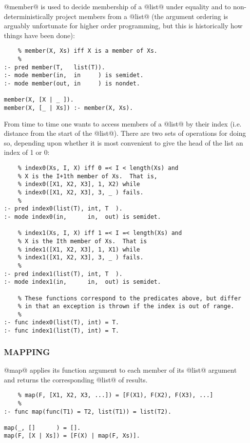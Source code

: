 \documentclass[a4paper,11pt,notitlepage,onecolumn]{article}
\begin{document}
@member@ is used to decide membership of a @list@ under equality and to
non-deterministically project members from a @list@ (the argument ordering
is arguably unfortunate for higher order programming, but this is
historically how things have been done):
\begin{verbatim}
    % member(X, Xs) iff X is a member of Xs.
    %
:- pred member(T,   list(T)).
:- mode member(in,  in     ) is semidet.
:- mode member(out, in     ) is nondet.

member(X, [X | _ ]).
member(X, [_ | Xs]) :- member(X, Xs).
\end{verbatim}
From time to time one wants to access members of a @list@ by their index
(i.e. distance from the start of the @list@).  There are two sets of
operations for doing so, depending upon whether it is most convenient to
give the head of the list an index of 1 or 0:
\begin{verbatim}
    % index0(Xs, I, X) iff 0 =< I < length(Xs) and
    % X is the I+1th member of Xs.  That is,
    % index0([X1, X2, X3], 1, X2) while
    % index0([X1, X2, X3], 3, _ ) fails.
    %
:- pred index0(list(T), int, T  ).
:- mode index0(in,      in,  out) is semidet.

    % index1(Xs, I, X) iff 1 =< I =< length(Xs) and
    % X is the Ith member of Xs.  That is
    % index1([X1, X2, X3], 1, X1) while
    % index1([X1, X2, X3], 3, _ ) fails.
    %
:- pred index1(list(T), int, T  ).
:- mode index1(in,      in,  out) is semidet.

    % These functions correspond to the predicates above, but differ
    % in that an exception is thrown if the index is out of range.
    %
:- func index0(list(T), int) = T.
:- func index1(list(T), int) = T.
\end{verbatim}

\subsubsection{MAPPING}

@map@ applies its function argument to each member of its @list@ argument
and returns the corresponding @list@ of results.
\begin{verbatim}
    % map(F, [X1, X2, X3, ...]) = [F(X1), F(X2), F(X3), ...]
    %
:- func map(func(T1) = T2, list(T1)) = list(T2).

map(_, []      ) = [].
map(F, [X | Xs]) = [F(X) | map(F, Xs)].
\end{verbatim}
\end{document}
